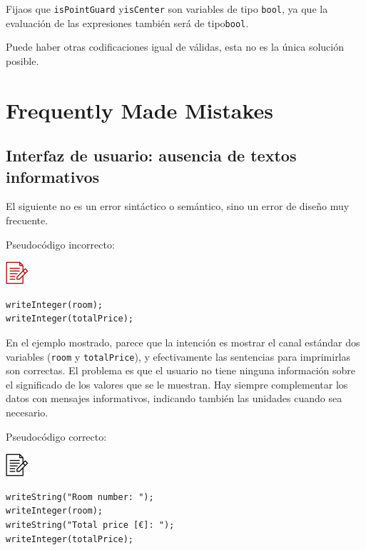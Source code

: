 \documentclass[
]{book}
\begin{document}
Fijaos que \texttt{isPointGuard} y\texttt{isCenter} son variables de tipo \texttt{bool}, ya que la evaluación de las expresiones también será de tipo\texttt{bool}.

Puede haber otras codificaciones igual de válidas, esta no es la única solución posible.

\hypertarget{frequently-made-mistakes-1}{%
\section{Frequently Made Mistakes}\label{frequently-made-mistakes-1}}

\hypertarget{interfaz-de-usuario-ausencia-de-textos-informativos}{%
\subsection{Interfaz de usuario: ausencia de textos informativos}\label{interfaz-de-usuario-ausencia-de-textos-informativos}}

El siguiente no es un error sintáctico o semántico, sino un error de diseño muy frecuente.

Pseudocódigo incorrecto:

\includegraphics{./img/alg_err.png}

\begin{verbatim}
writeInteger(room);
writeInteger(totalPrice);
\end{verbatim}

En el ejemplo mostrado, parece que la intención es mostrar el canal estándar dos variables (\texttt{room} y \texttt{totalPrice}), y efectivamente las sentencias para imprimirlas son correctas. El problema es que el usuario no tiene ninguna información sobre el significado de los valores que se le muestran. Hay siempre complementar los datos con mensajes informativos, indicando también las unidades cuando sea necesario.

Pseudocódigo correcto:

\includegraphics{./img/alg.png}

\begin{verbatim}
writeString("Room number: ");
writeInteger(room);
writeString("Total price [€]: ");
writeInteger(totalPrice);
\end{verbatim}
\end{document}
